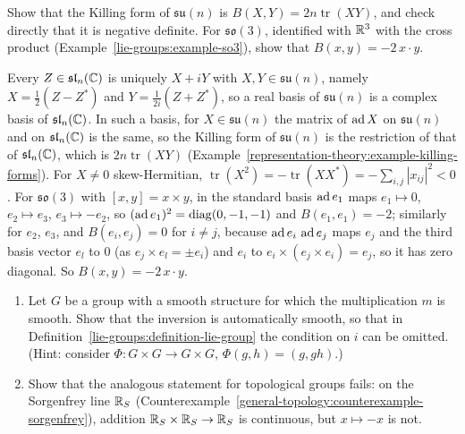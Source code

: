 \begin{exercise}\label{lie-groups:exercise-killing-su-n}
Show that the Killing form of $\mathfrak{su}(n)$ is $B(X, Y) = 2n\operatorname{tr}(XY)$, and check directly that it is negative definite. For $\mathfrak{so}(3)$, identified with $\mathbb{R}^3$ with the
cross product (Example~\ref{lie-groups:example-so3}), show that $B(x, y) = -2\,x \cdot y$.
\end{exercise}

\begin{solution}
Every $Z \in \mathfrak{sl}_n(\mathbb{C})$ is uniquely $X + iY$ with $X, Y \in \mathfrak{su}(n)$, namely $X = \frac12(Z - Z^*)$ and $Y = \frac1{2i}(Z + Z^*)$, so a real basis of $\mathfrak{su}(n)$ is a
complex basis of $\mathfrak{sl}_n(\mathbb{C})$. In such a basis, for $X \in \mathfrak{su}(n)$ the matrix of $\operatorname{ad} X$ on $\mathfrak{su}(n)$ and on $\mathfrak{sl}_n(\mathbb{C})$ is the same, so the Killing form of
$\mathfrak{su}(n)$ is the restriction of that of $\mathfrak{sl}_n(\mathbb{C})$, which is $2n\operatorname{tr}(XY)$ (Example~\ref{representation-theory:example-killing-forms}). For
$X \neq 0$ skew-Hermitian, $\operatorname{tr}(X^2) = -\operatorname{tr}(XX^*) = -\sum_{i,j}|x_{ij}|^2 < 0$. For $\mathfrak{so}(3)$ with $[x, y] = x \times y$, in the standard basis
$\operatorname{ad} e_1$ maps $e_1 \mapsto 0$, $e_2 \mapsto e_3$, $e_3 \mapsto -e_2$, so $(\operatorname{ad} e_1)^2 = \operatorname{diag}(0, -1, -1)$ and $B(e_1, e_1) = -2$; similarly for $e_2$, $e_3$, and
$B(e_i, e_j) = 0$ for $i \neq j$, because $\operatorname{ad} e_i\,\operatorname{ad} e_j$ maps $e_j$ and the third basis vector $e_l$ to $0$ (as $e_j \times e_l = \pm e_i$) and $e_i$ to
$e_i \times (e_j \times e_i) = e_j$, so it has zero diagonal. So $B(x, y) = -2\,x \cdot y$.
\end{solution}

\begin{exercise}\label{lie-groups:exercise-inversion-automatic}
\begin{enumerate}
\item Let $G$ be a group with a smooth structure for which the multiplication $m$ is smooth. Show that the inversion is automatically smooth, so that in
Definition~\ref{lie-groups:definition-lie-group} the condition on $i$ can be omitted. (Hint: consider $\Phi \colon G \times G \to G \times G$, $\Phi(g, h) = (g, gh)$.)
\item Show that the analogous statement for topological groups fails: on the Sorgenfrey line $\mathbb{R}_S$ (Counterexample~\ref{general-topology:counterexample-sorgenfrey}), addition
$\mathbb{R}_S \times \mathbb{R}_S \to \mathbb{R}_S$ is continuous, but $x \mapsto -x$ is not.
\end{enumerate}
\end{exercise}

